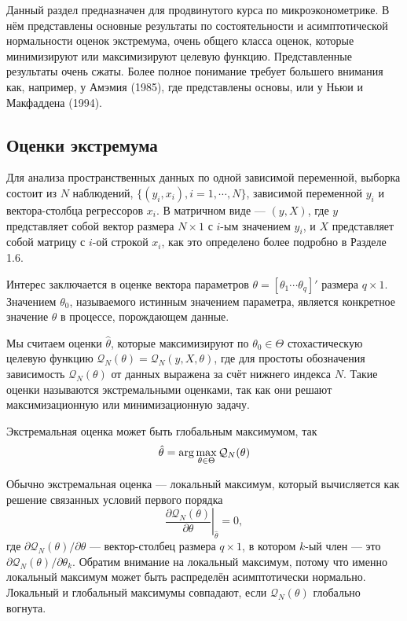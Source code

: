 Данный раздел предназначен для продвинутого курса по микроэконометрике. В нём представлены основные результаты по состоятельности и асимптотической нормальности оценок экстремума, очень общего класса оценок, которые минимизируют или максимизируют целевую функцию. Представленные результаты очень сжаты. Более полное понимание требует большего внимания как, например, у Амэмия (1985), где представлены основы, или у Ньюи и Макфаддена (1994).

\subsection{Оценки экстремума}

Для анализа пространственных данных по одной зависимой переменной, выборка состоит из $N$ наблюдений, 
$\{(y_i,x_i),i=1,\cdots,N\}$, зависимой переменной $y_i$ и вектора-столбца регрессоров $x_i$. 
В матричном виде --- $(y,X)$, где $y$ представляет собой вектор размера $N \times 1$ с $i$-ым значением $y_i$, и $X$ представляет собой матрицу с $i$-ой строкой $x_i$, как это определено более подробно в Разделе 1.6.

Интерес заключается в оценке вектора параметров $\theta=[\theta_1 \cdots \theta_q]'$ размера $q \times 1$. Значением $\theta_0$, называемого истинным значением параметра, является конкретное значение $\theta$ в процессе, порождающем данные.

Мы считаем оценки $\hat{\theta}$, которые максимизируют по $\theta_0 \in \Theta$ стохастическую целевую функцию $\mathcal{Q}_N(\theta)=\mathcal{Q}_N(y,X,\theta)$, где для простоты обозначения зависимость $\mathcal{Q}_N(\theta)$ от данных выражена за счёт нижнего индекса $N$. Такие оценки называются экстремальными оценками, так как они решают максимизационную или минимизационную задачу.

Экстремальная оценка может быть глобальным максимумом, так
\begin{equation}
\hat{\theta}= \arg\max _{\theta \in \Theta} \mathcal{Q}_N(\theta)
\end{equation}

Обычно  экстремальная оценка --- локальный максимум, который вычисляется как решение связанных условий первого порядка
\begin{equation}
\left. \frac{\partial \mathcal{Q}_N(\theta)}{\partial \theta} \right|_{\hat{\theta}}=0,
\end{equation}
где $\partial \mathcal{Q}_N(\theta)/ \partial \theta$ --- вектор-столбец размера $q \times 1$, в котором $k$-ый член --- это $\partial \mathcal{Q}_N(\theta)/ \partial \theta_k$. Обратим внимание на локальный максимум, потому что именно локальный максимум может быть распределён асимптотически нормально. Локальный и глобальный максимумы совпадают, если $\mathcal{Q}_N(\theta)$ глобально вогнута.

